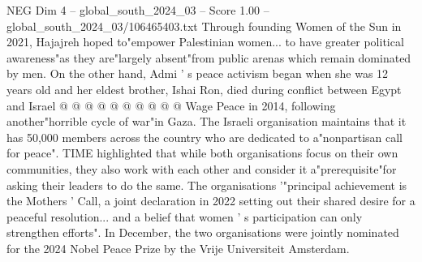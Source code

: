 \begin{textsample}{NEG Dim 4 – global\_south\_2024\_03 – Score 1.00 – global\_south\_2024\_03/106465403.txt}
Through founding Women of the Sun in 2021, Hajajreh hoped to"empower Palestinian women... to have greater political awareness"as they are"largely absent"from public arenas which remain dominated by men.
On the other hand, Admi ' s peace activism began when she was 12 years old and her eldest brother, Ishai Ron, died during conflict between Egypt and Israel @ @ @ @ @ @ @ @ @ @ Wage Peace in 2014, following another"horrible cycle of war"in Gaza.
The Israeli organisation maintains that it has 50,000 members across the country who are dedicated to a"nonpartisan call for peace".
TIME highlighted that while both organisations focus on their own communities, they also work with each other and consider it a"prerequisite"for asking their leaders to do the same.
The organisations '"principal achievement is the Mothers ' Call, a joint declaration in 2022 setting out their shared desire for a peaceful resolution... and a belief that women ' s participation can only strengthen efforts".
In December, the two organisations were jointly nominated for the 2024 Nobel Peace Prize by the Vrije Universiteit Amsterdam.

\end{textsample}
